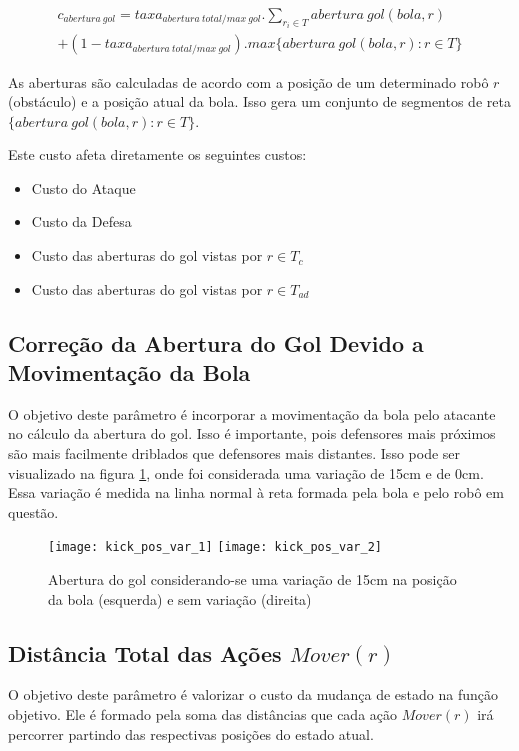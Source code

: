 \begin{multline} 
 c_{abertura{\ }gol} = taxa_{abertura{\ }total/max{\ }gol} .
   \sum_{r_i \in T} abertura{\ }gol(bola, r)\\
   + (1 - taxa_{abertura{\ }total/max{\ }gol}) .
   max \lbrace abertura{\ }gol(bola, r): r \in T \rbrace 
\end{multline}

As aberturas são calculadas de acordo com a posição de um determinado robô $r$ (obstáculo)
e a posição atual da bola. Isso gera um conjunto de segmentos de reta
$\lbrace abertura{\ }gol(bola, r): r \in T \rbrace$.

Este custo afeta diretamente os seguintes custos:
\begin{itemize}
  \item Custo do Ataque
  \item Custo da Defesa
  \item Custo das aberturas do gol vistas por $r\in T_c$
  \item Custo das aberturas do gol vistas por $r\in T_{ad}$
\end{itemize}

\subsection{Correção da Abertura do Gol Devido a Movimentação da Bola} 
O objetivo deste parâmetro é incorporar a movimentação
da bola pelo atacante no cálculo da abertura do gol. Isso é importante,
pois defensores mais
próximos são mais facilmente driblados que defensores mais distantes. Isso
pode ser visualizado na figura \ref{fig:kick_pos}, onde foi considerada
uma variação de 15cm e de 0cm. Essa variação é medida na linha normal
à reta formada pela bola e pelo robô em questão.


\begin{figure}[H]
  \centering
  \texttt{[image: kick\_pos\_var\_1]}
  \texttt{[image: kick\_pos\_var\_2]}
  \caption{Abertura do gol considerando-se uma variação de 15cm na 
           posição da bola (esquerda) e sem variação (direita)}\label{fig:kick_pos}
\end{figure}


\subsection{Distância Total das Ações $Mover(r)$} 
O objetivo deste parâmetro é valorizar o custo da
mudança de estado na função objetivo. Ele é formado pela soma das
distâncias que cada ação $Mover(r)$ irá percorrer partindo das
respectivas posições do estado atual.

